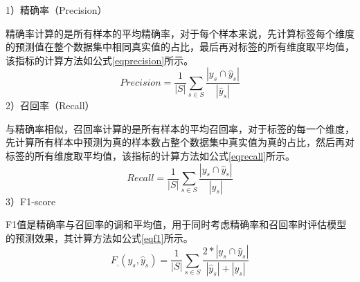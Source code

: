 1）精确率（Precision）\par
精确率计算的是所有样本的平均精确率，对于每个样本来说，先计算标签每个维度的预测值在整个数据集中相同真实值的占比，最后再对标签的所有维度取平均值，该指标的计算方法如公式\eqref{eqprecision}所示。
\begin{equation}
    Precision=\frac1{|S|}\sum_{s\in S}\frac{|y_s\cap\hat{y}_s|}{|\hat{y}_s|} \label{eqprecision}
\end{equation}
2）召回率（Recall）\par
与精确率相似，召回率计算的是所有样本的平均召回率，对于标签的每一个维度，先计算所有样本中预测为真的样本数占整个数据集中真实值为真的占比，然后再对标签的所有维度取平均值，该指标的计算方法如公式\eqref{eqrecall}所示。
\begin{equation}
    Recall=\frac{1}{|S|}\sum_{s\in S}\frac{|y_s\cap\hat{y}_s|}{|y_s|} \label{eqrecall}
\end{equation}
3）F1-score\par
F1值是精确率与召回率的调和平均值，用于同时考虑精确率和召回率时评估模型的预测效果，其计算方法如公式\eqref{eqf1}所示。
\begin{equation}
    F_\text{,}(y_s,\hat{y}_s)=\frac{1}{|S|}\sum_{s\in S}\frac{2*|y_s\cap\hat{y}_s|}{|\hat{y}_s|+|y_s|} \label{eqf1}
\end{equation}

